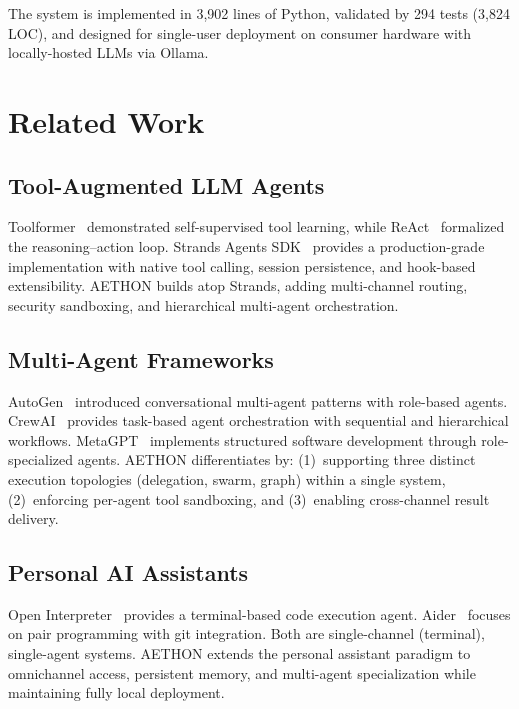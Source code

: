 \documentclass[9pt,twocolumn,letterpaper]{extarticle}
\begin{document}
\noindent The system is implemented in 3{,}902 lines of Python, validated by 294 tests (3{,}824 LOC), and designed for single-user deployment on consumer hardware with locally-hosted LLMs via Ollama.

\section{Related Work}
\label{sec:related}

\subsection{Tool-Augmented LLM Agents}

Toolformer~\cite{schick2023toolformer} demonstrated self-supervised tool learning, while ReAct~\cite{yao2023react} formalized the reasoning--action loop.
Strands Agents SDK~\cite{strands2025} provides a production-grade implementation with native tool calling, session persistence, and hook-based extensibility.
AETHON builds atop Strands, adding multi-channel routing, security sandboxing, and hierarchical multi-agent orchestration.

\subsection{Multi-Agent Frameworks}

AutoGen~\cite{wu2023autogen} introduced conversational multi-agent patterns with role-based agents.
CrewAI~\cite{crewai2024} provides task-based agent orchestration with sequential and hierarchical workflows.
MetaGPT~\cite{hong2023metagpt} implements structured software development through role-specialized agents.
AETHON differentiates by: (1)~supporting three distinct execution topologies (delegation, swarm, graph) within a single system, (2)~enforcing per-agent tool sandboxing, and (3)~enabling cross-channel result delivery.

\subsection{Personal AI Assistants}

Open Interpreter~\cite{openinterpreter2023} provides a terminal-based code execution agent.
Aider~\cite{aider2023} focuses on pair programming with git integration.
Both are single-channel (terminal), single-agent systems.
AETHON extends the personal assistant paradigm to omnichannel access, persistent memory, and multi-agent specialization while maintaining fully local deployment.
\end{document}
